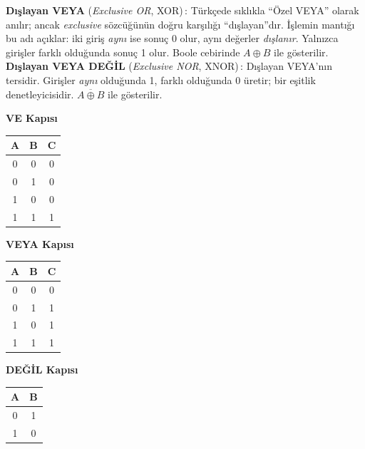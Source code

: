 \begin{terimnotu}
\textbf{Dışlayan VEYA} (\emph{Exclusive OR}, XOR)\,: Türkçede sıklıkla ``Özel VEYA'' olarak anılır; ancak \emph{exclusive} sözcüğünün doğru karşılığı ``dışlayan''dır. İşlemin mantığı bu adı açıklar: iki giriş \emph{aynı} ise sonuç 0 olur, aynı değerler \emph{dışlanır}. Yalnızca girişler farklı olduğunda sonuç 1 olur. Boole cebirinde $A \oplus B$ ile gösterilir.\\[4pt]
\textbf{Dışlayan VEYA DEĞİL} (\emph{Exclusive NOR}, XNOR)\,: Dışlayan VEYA'nın tersidir. Girişler \emph{aynı} olduğunda 1, farklı olduğunda 0 üretir; bir eşitlik denetleyicisidir. $\overline{A \oplus B}$ ile gösterilir.
\end{terimnotu}

\begin{table}[H]
\centering
\begin{minipage}{0.3\textwidth}
\centering
\textbf{VE Kapısı}
\vspace{0.3em}

\begin{tabular}{cc|c}
\toprule
\textbf{A} & \textbf{B} & \textbf{C} \\
\midrule
0 & 0 & 0 \\
0 & 1 & 0 \\
1 & 0 & 0 \\
1 & 1 & 1 \\
\bottomrule
\end{tabular}
\end{minipage}
\hfill
\begin{minipage}{0.3\textwidth}
\centering
\textbf{VEYA Kapısı}
\vspace{0.3em}

\begin{tabular}{cc|c}
\toprule
\textbf{A} & \textbf{B} & \textbf{C} \\
\midrule
0 & 0 & 0 \\
0 & 1 & 1 \\
1 & 0 & 1 \\
1 & 1 & 1 \\
\bottomrule
\end{tabular}
\end{minipage}
\hfill
\begin{minipage}{0.3\textwidth}
\centering
\textbf{DEĞİL Kapısı}
\vspace{0.3em}

\begin{tabular}{c|c}
\toprule
\textbf{A} & \textbf{B} \\
\midrule
0 & 1 \\
1 & 0 \\
\bottomrule
\end{tabular}
\end{minipage}
\end{table}

